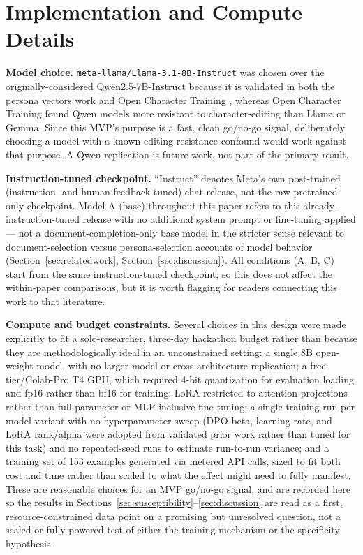 \documentclass[10pt]{article}
\begin{document}
\section{Implementation and Compute Details}
\label{app:implementation}

\textbf{Model choice.} \texttt{meta-llama/Llama-3.1-8B-Instruct} was chosen over the originally-considered Qwen2.5-7B-Instruct because it is validated in both the persona vectors work \citep{chen2025persona} and Open Character Training \citep{maiya2025open}, whereas Open Character Training found Qwen models more resistant to character-editing than Llama or Gemma. Since this MVP's purpose is a fast, clean go/no-go signal, deliberately choosing a model with a known editing-resistance confound would work against that purpose. A Qwen replication is future work, not part of the primary result.

\textbf{Instruction-tuned checkpoint.} ``Instruct'' denotes Meta's own post-trained (instruction- and human-feedback-tuned) chat release, not the raw pretrained-only checkpoint. Model A (base) throughout this paper refers to this already-instruction-tuned release with no additional system prompt or fine-tuning applied --- not a document-completion-only base model in the stricter sense relevant to document-selection versus persona-selection accounts of model behavior (Section~\ref{sec:relatedwork}, Section~\ref{sec:discussion}). All conditions (A, B, C) start from the same instruction-tuned checkpoint, so this does not affect the within-paper comparisons, but it is worth flagging for readers connecting this work to that literature.

\textbf{Compute and budget constraints.} Several choices in this design were made explicitly to fit a solo-researcher, three-day hackathon budget rather than because they are methodologically ideal in an unconstrained setting: a single 8B open-weight model, with no larger-model or cross-architecture replication; a free-tier/Colab-Pro T4 GPU, which required 4-bit quantization for evaluation loading and fp16 rather than bf16 for training; LoRA restricted to attention projections rather than full-parameter or MLP-inclusive fine-tuning; a single training run per model variant with no hyperparameter sweep (DPO beta, learning rate, and LoRA rank/alpha were adopted from validated prior work rather than tuned for this task) and no repeated-seed runs to estimate run-to-run variance; and a training set of 153 examples generated via metered API calls, sized to fit both cost and time rather than scaled to what the effect might need to fully manifest. These are reasonable choices for an MVP go/no-go signal, and are recorded here so the results in Sections~\ref{sec:susceptibility}--\ref{sec:discussion} are read as a first, resource-constrained data point on a promising but unresolved question, not a scaled or fully-powered test of either the training mechanism or the specificity hypothesis.
\end{document}
